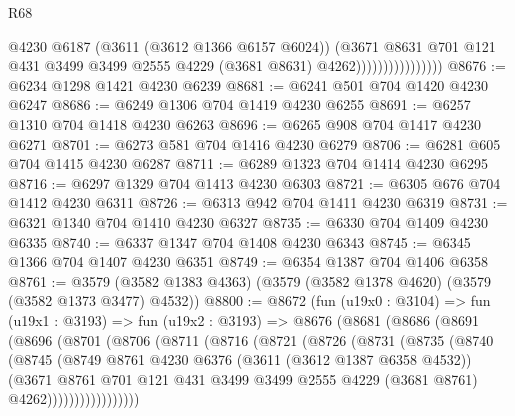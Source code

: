 \begin{lexlean}{R68}
\begin{coremodule}
                                  @4230
                                  @6187
                                  (@3611 (@3612 @1366 @6157 @6024))
                                  (@3671
                                    @8631
                                    @701
                                    @121
                                    @431
                                    @3499
                                    @3499
                                    @2555
                                    @4229
                                    (@3681 @8631)
                                    @4262))))))))))))))))
@8676 := @6234 @1298 @1421 @4230 @6239
@8681 := @6241 @501 @704 @1420 @4230 @6247
@8686 := @6249 @1306 @704 @1419 @4230 @6255
@8691 := @6257 @1310 @704 @1418 @4230 @6263
@8696 := @6265 @908 @704 @1417 @4230 @6271
@8701 := @6273 @581 @704 @1416 @4230 @6279
@8706 := @6281 @605 @704 @1415 @4230 @6287
@8711 := @6289 @1323 @704 @1414 @4230 @6295
@8716 := @6297 @1329 @704 @1413 @4230 @6303
@8721 := @6305 @676 @704 @1412 @4230 @6311
@8726 := @6313 @942 @704 @1411 @4230 @6319
@8731 := @6321 @1340 @704 @1410 @4230 @6327
@8735 := @6330 @704 @1409 @4230 @6335
@8740 := @6337 @1347 @704 @1408 @4230 @6343
@8745 := @6345 @1366 @704 @1407 @4230 @6351
@8749 := @6354 @1387 @704 @1406 @6358
@8761 := @3579 (@3582 @1383 @4363) (@3579 (@3582 @1378 @4620) (@3579 (@3582 @1373 @3477) @4532))
@8800 := @8672
    (fun (u19x0 : @3104) =>
    fun (u19x1 : @3193) =>
    fun (u19x2 : @3193) =>
    @8676
      (@8681
        (@8686
          (@8691
            (@8696
              (@8701
                (@8706
                  (@8711
                    (@8716
                      (@8721
                        (@8726
                          (@8731
                            (@8735
                              (@8740
                                (@8745
                                  (@8749
                                    @8761
                                    @4230
                                    @6376
                                    (@3611 (@3612 @1387 @6358 @4532))
                                    (@3671
                                      @8761
                                      @701
                                      @121
                                      @431
                                      @3499
                                      @3499
                                      @2555
                                      @4229
                                      (@3681 @8761)
                                      @4262)))))))))))))))))

\end{coremodule}
\end{lexlean}
